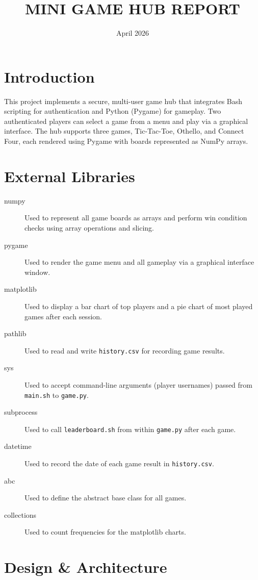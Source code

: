 \documentclass[12pt]{article}
\title{MINI GAME HUB REPORT}
\date{April 2026}
\author{}
\begin{document}
\maketitle
\tableofcontents
\newpage

\section{Introduction}
This project implements a secure, multi-user game hub that integrates Bash scripting for authentication and Python (Pygame) for gameplay. Two authenticated players can select a game from a menu and play via a graphical interface. The hub supports three games, Tic-Tac-Toe, Othello, and Connect Four, each rendered using Pygame with boards represented as NumPy arrays.

\section{External Libraries}
\begin{description}
    \item[numpy] Used to represent all game boards as arrays and perform win condition checks using array operations and slicing.
    \item[pygame] Used to render the game menu and all gameplay via a graphical interface window.
    \item[matplotlib] Used to display a bar chart of top players and a pie chart of most played games after each session.
    \item[pathlib] Used to read and write \texttt{history.csv} for recording game results.
    \item[sys] Used to accept command-line arguments (player usernames) passed from \texttt{main.sh} to \texttt{game.py}.
    \item[subprocess] Used to call \texttt{leaderboard.sh} from within \texttt{game.py} after each game.
    \item[datetime] Used to record the date of each game result in \texttt{history.csv}.
    \item[abc] Used to define the abstract base class for all games.
    \item[collections] Used to count frequencies for the matplotlib charts.
\end{description}

\section{Design \& Architecture}
\end{document}
